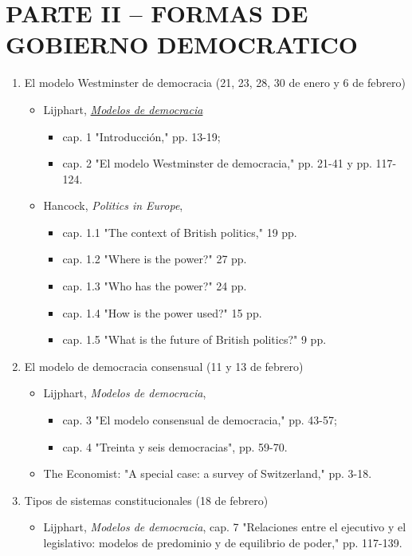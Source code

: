 \documentclass{article}
\begin{document}
\section{PARTE II – FORMAS DE GOBIERNO DEMOCRATICO}
\label{sec:orgce81d67}
\begin{enumerate}
\item El modelo Westminster de democracia  (21, 23, 28, 30 de enero y 6 de febrero)
\label{sec:org7444fa1}
\begin{itemize}
\item Lijphart, \href{https://github.com/emagar/ep3/blob/master/lecturas/lijphart-mod-democ}{\emph{Modelos de democracia}}
\begin{itemize}
\item cap. 1 "Introducción," pp. 13-19;
\item cap. 2 "El modelo Westminster de democracia," pp. 21-41 y pp. 117-124.
\end{itemize}
\item Hancock, \emph{Politics in Europe}, 
\begin{itemize}
\item cap. 1.1 "The context of British politics," 19 pp.
\item cap. 1.2 "Where is the power?" 27 pp.
\item cap. 1.3 "Who has the power?" 24 pp.
\item cap. 1.4 "How is the power used?" 15 pp.
\item cap. 1.5 "What is the future of British politics?" 9 pp.
\end{itemize}
\end{itemize}
\item El modelo de democracia consensual  (11 y 13 de febrero)
\label{sec:org594f12c}
\begin{itemize}
\item Lijphart, \emph{Modelos de democracia}, 
\begin{itemize}
\item cap. 3 "El modelo consensual de democracia," pp. 43-57;
\item cap. 4 "Treinta y seis democracias", pp. 59-70.
\end{itemize}
\item The Economist: "A special case: a survey of Switzerland," pp. 3-18.
\end{itemize}
\item Tipos de sistemas constitucionales  (18 de febrero)
\label{sec:org83cdfc5}
\begin{itemize}
\item Lijphart, \emph{Modelos de democracia}, cap. 7 "Relaciones entre el ejecutivo y el legislativo: modelos de predominio y de equilibrio de poder," pp. 117-139.

\end{itemize}
\end{enumerate}
\end{document}
